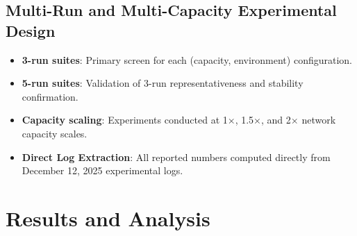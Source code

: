 \documentclass[12pt,a4paper]{article}
\begin{document}
\subsection{Multi-Run and Multi-Capacity Experimental Design}
\begin{itemize}
\item \textbf{3-run suites}: Primary screen for each (capacity, environment) configuration.
\item \textbf{5-run suites}: Validation of 3-run representativeness and stability confirmation.
\item \textbf{Capacity scaling}: Experiments conducted at 1$\times$, 1.5$\times$, and 2$\times$ network capacity scales.
\item \textbf{Direct Log Extraction}: All reported numbers computed directly from December 12, 2025 experimental logs.
\end{itemize}

\newpage
\section{Results and Analysis}
\end{document}
